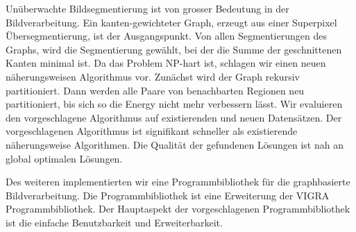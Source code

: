 
Un\"uberwachte Bildsegmentierung
ist von grosser Bedeutung in der Bildverarbeitung.
Ein kanten-gewichteter Graph, erzeugt aus einer
Superpixel \"Ubersegmentierung,  ist der Ausgangspunkt.
Von allen Segmentierungen  des Graphs,
wird die Segmentierung gew\"ahlt,
bei der die Summe der geschnittenen  Kanten
minimal ist.
Da das Problem NP-hart ist, schlagen wir
einen neuen n\"aherungsweisen Algorithmus vor.
Zun\"achst wird der Graph rekursiv partitioniert.
Dann werden alle Paare von benachbarten
Regionen neu partitioniert,
bis sich so die Energy nicht mehr verbessern l\"asst.
Wir evaluieren den vorgeschlagene Algorithmus
auf existierenden und neuen Datens\"atzen.
Der vorgeschlagenen Algorithmus
ist signifikant schneller als
existierende  n\"aherungsweise Algorithmen.
Die Qualit\"at der gefundenen L\"osungen
ist nah an global optimalen L\"osungen.


Des weiteren implementierten  wir eine
Programmbibliothek f\"ur  die graphbasierte  Bildverarbeitung.
Die Programmbibliothek ist eine Erweiterung der VIGRA Programmbibliothek.
Der Hauptaspekt der vorgeschlagenen Programmbibliothek
ist die einfache Benutzbarkeit und Erweiterbarkeit.



\endgroup           

\vfill